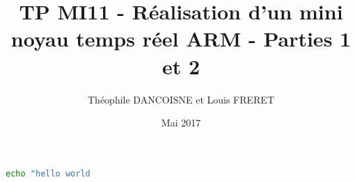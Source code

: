 \documentclass{article}
\title{TP MI11 - Réalisation d’un mini noyau temps réel ARM - Parties 1 et 2}
\author{Théophile DANCOISNE et Louis FRERET}
\date{Mai 2017}
\begin{document}
\maketitle



\begin{lstlisting}[language=bash]
  echo "hello world
\end{lstlisting}
\end{document}
